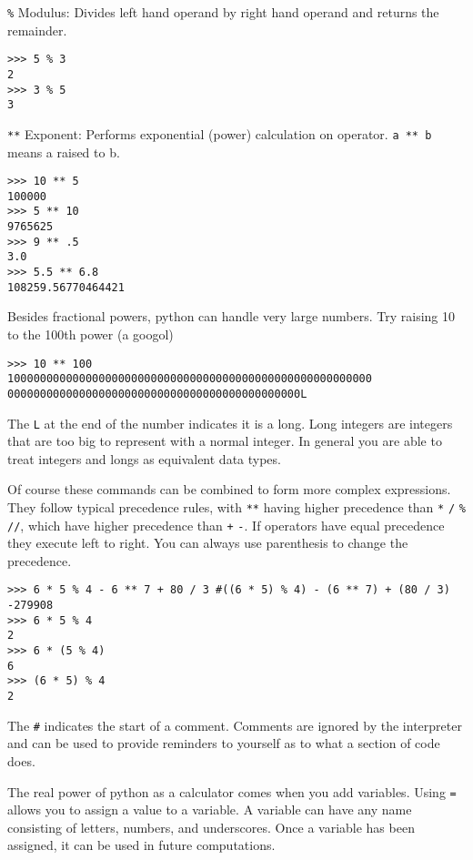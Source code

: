 \documentclass[12pt]{article}
\begin{document}

\texttt{\%} Modulus: Divides left hand operand by right hand operand and returns the remainder.

\begin{lstlisting}[style=bash]
>>> 5 % 3
2
>>> 3 % 5
3
\end{lstlisting}

\texttt{**} Exponent: Performs exponential (power) calculation on operator. \texttt{a ** b} means a raised to b.

\begin{lstlisting}[style=bash]
>>> 10 ** 5
100000
>>> 5 ** 10 
9765625
>>> 9 ** .5
3.0
>>> 5.5 ** 6.8
108259.56770464421
\end{lstlisting}

Besides fractional powers, python can handle very large numbers. Try raising 10 to the 100th power (a googol)

\begin{lstlisting}[style=bash]
>>> 10 ** 100
10000000000000000000000000000000000000000000000000000000
000000000000000000000000000000000000000000000L
\end{lstlisting}

The \texttt{L} at the end of the number indicates it is a long. Long integers are integers that are too big to represent with a normal integer. In general you are able to treat integers and longs as equivalent data types.

Of course these commands can be combined to form more complex expressions. They follow typical precedence rules, with \texttt{**} having higher precedence than \texttt{*} \texttt{/} \texttt{\%} \texttt{//}, which have higher precedence than \texttt{+} \texttt{-}. If operators have equal precedence they execute left to right. You can always use parenthesis to change the precedence.

\begin{lstlisting}[style=bash]
>>> 6 * 5 % 4 - 6 ** 7 + 80 / 3 #((6 * 5) % 4) - (6 ** 7) + (80 / 3)
-279908
>>> 6 * 5 % 4
2
>>> 6 * (5 % 4)
6
>>> (6 * 5) % 4
2
\end{lstlisting}

The \texttt{\#} indicates the start of a comment. Comments are ignored by the interpreter and can be used to provide reminders to yourself as to what a section of code does.

The real power of python as a calculator comes when you add variables. Using \texttt{=} allows you to assign a value to a variable. A variable can have any name consisting of letters, numbers, and underscores. Once a variable has been assigned, it can be used in future computations.
\end{document}
